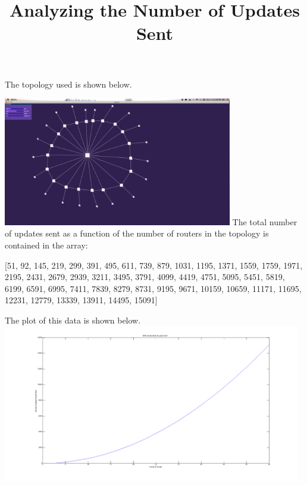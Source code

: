 \documentclass[]{article}
\begin{document}
\title{Analyzing the Number of Updates Sent}
\maketitle
\newpage
The topology used is shown below. \\
\linebreak

\begin{center}
\includegraphics[width=10cm]{topology.png}
\linebreak
The total number of updates sent as a function of the number of routers in the topology is contained in the array: 

[51, 92, 145, 219, 299, 391, 495, 611, 739, 879, 1031, 1195, 1371, 1559, 1759, 1971, 2195, 2431, 2679, 2939, 3211, 3495, 3791, 4099, 4419, 4751, 5095, 5451, 5819, 6199, 6591, 6995, 7411, 7839, 8279, 8731, 9195, 9671, 10159, 10659, 11171, 11695, 12231, 12779, 13339, 13911, 14495, 15091]
\linebreak

The plot of this data is shown below.
\includegraphics[width=13cm]{plot.png}
\end{center}
\end{document}
